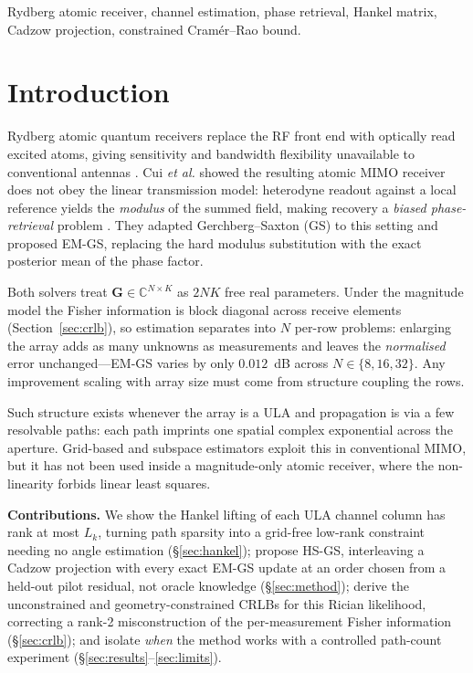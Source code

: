 \documentclass[conference]{IEEEtran}
\newcommand{\bG}{\mathbf{G}}
\begin{document}
\begin{IEEEkeywords}
Rydberg atomic receiver, channel estimation, phase retrieval, Hankel matrix,
Cadzow projection, constrained Cram\'er--Rao bound.
\end{IEEEkeywords}

\section{Introduction}
Rydberg atomic quantum receivers replace the RF front end with optically read
excited atoms, giving sensitivity and bandwidth flexibility unavailable to
conventional antennas \cite{cui2025,fancher2021}. Cui \emph{et
al.} \cite{cui2025} showed the resulting atomic MIMO receiver does not obey
the linear transmission model: heterodyne readout against a local reference
yields the \emph{modulus} of the summed field, making recovery a \emph{biased
phase-retrieval} problem \cite{netrapalli2015,dong2023}. They adapted
Gerchberg--Saxton (GS) \cite{gerchberg1972} to this setting and proposed
EM-GS, replacing the hard modulus substitution with the exact posterior mean
of the phase factor.

Both solvers treat $\bG\in\mathbb{C}^{N\times K}$ as $2NK$ free real
parameters. Under the magnitude model the Fisher information is block diagonal
across receive elements (Section~\ref{sec:crlb}), so estimation separates into
$N$ per-row problems: enlarging the array adds as many unknowns as
measurements and leaves the \emph{normalised} error unchanged---EM-GS varies
by only $0.012$~dB across $N\in\{8,16,32\}$. Any improvement scaling with
array size must come from structure coupling the rows.

Such structure exists whenever the array is a ULA and propagation is via a few
resolvable paths: each path imprints one spatial complex exponential across
the aperture. Grid-based and subspace estimators exploit this in conventional
MIMO, but it has not been used inside a magnitude-only atomic receiver, where
the non-linearity forbids linear least squares.

\textbf{Contributions.} We show the Hankel lifting of each ULA channel column
has rank at most $L_k$, turning path sparsity into a grid-free low-rank
constraint needing no angle estimation (\S\ref{sec:hankel}); propose HS-GS,
interleaving a Cadzow projection with every exact EM-GS update at an order
chosen from a held-out pilot residual, not oracle knowledge
(\S\ref{sec:method}); derive the unconstrained and geometry-constrained CRLBs
for this Rician likelihood, correcting a rank-2 misconstruction of the
per-measurement Fisher information (\S\ref{sec:crlb}); and isolate \emph{when}
the method works with a controlled path-count experiment
(\S\ref{sec:results}--\ref{sec:limits}).
\end{document}
